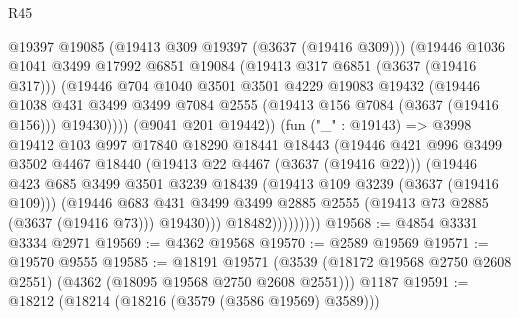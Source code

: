 \begin{lexlean}{R45}
\begin{coremodule}
                        @19397
                        @19085
                        (@19413 @309 @19397 (@3637 (@19416 @309)))
                        (@19446
                          @1036
                          @1041
                          @3499
                          @17992
                          @6851
                          @19084
                          (@19413 @317 @6851 (@3637 (@19416 @317)))
                          (@19446
                            @704
                            @1040
                            @3501
                            @3501
                            @4229
                            @19083
                            @19432
                            (@19446
                              @1038
                              @431
                              @3499
                              @3499
                              @7084
                              @2555
                              (@19413 @156 @7084 (@3637 (@19416 @156)))
                              @19430))))
                      (@9041 @201 @19442))
                    (fun ("_" : @19143) =>
                    @3998
                      @19412
                      @103
                      @997
                      @17840
                      @18290
                      @18441
                      @18443
                      (@19446
                        @421
                        @996
                        @3499
                        @3502
                        @4467
                        @18440
                        (@19413 @22 @4467 (@3637 (@19416 @22)))
                        (@19446
                          @423
                          @685
                          @3499
                          @3501
                          @3239
                          @18439
                          (@19413 @109 @3239 (@3637 (@19416 @109)))
                          (@19446
                            @683
                            @431
                            @3499
                            @3499
                            @2885
                            @2555
                            (@19413 @73 @2885 (@3637 (@19416 @73)))
                            @19430)))
                      @18482)))))))))
@19568 := @4854 @3331 @3334 @2971
@19569 := @4362 @19568
@19570 := @2589 @19569
@19571 := @19570 @9555
@19585 := @18191
    @19571
    (@3539 (@18172 @19568 @2750 @2608 @2551) (@4362 (@18095 @19568 @2750 @2608 @2551)))
    @1187
@19591 := @18212 (@18214 (@18216 (@3579 (@3586 @19569) @3589)))

\end{coremodule}
\end{lexlean}
